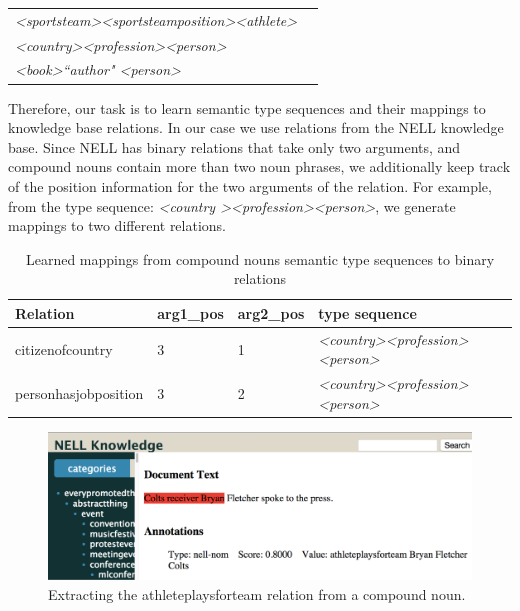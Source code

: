 \begin{table}[h]
%
\centering
%
 \begin{tabular}{ll}
   \hline
\textit{\textless sportsteam\textgreater \textless sportsteamposition\textgreater \textless athlete\textgreater}  \\
\textit{\textless country\textgreater \textless profession\textgreater \textless person\textgreater} \\
\textit{\textless book\textgreater  ``author" \textless person\textgreater} \\
        \hline
 \end{tabular}
   \label{tab:nominalstypesequences}
 \end{table}
     
     

Therefore, our task is to learn semantic type sequences and their mappings to knowledge base relations. In our case we use relations from the NELL knowledge base. Since  NELL has   binary relations that  take only two arguments, and compound nouns contain more than two noun phrases,  we additionally keep track of the position information for the two arguments of the relation.  For example, from the type sequence:   \textit{\textless country \textgreater \textless profession\textgreater \textless person\textgreater}, we generate mappings to two different  relations.

\begin{table}[h]
\begin{tabular}{llll}
\hline
\textbf{Relation}&  \textbf{arg1\_pos} &  \textbf{arg2\_pos} & \textbf{type sequence} \\
\hline
citizenofcountry & 3 & 1 & \textit{\textless country\textgreater \textless profession\textgreater \textless person\textgreater} \\
personhasjobposition & 3 & 2 & \textit{\textless country\textgreater \textless profession\textgreater \textless person\textgreater} \\
     \hline
\end{tabular}
\caption{Learned mappings from compound nouns semantic type sequences to binary relations }
\label{tab:nominalsmappings}
\end{table}

\begin{figure}[t]
%
\centering
%
\includegraphics[width=1\columnwidth] {athletenominal.png}
%
\caption{Extracting the athleteplaysforteam relation from a compound noun.}
%
\label{fig:athletenominal}
%
\end{figure}

